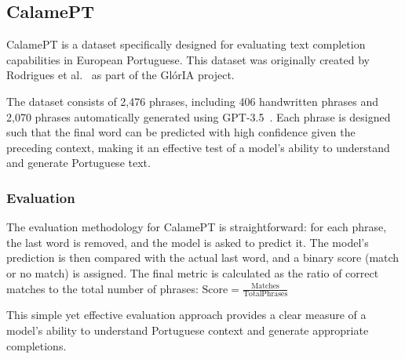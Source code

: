 \subsection{CalamePT}\label{Section3.3.2}
CalamePT is a dataset specifically designed for evaluating text completion capabilities in European Portuguese. This dataset was originally created by Rodrigues et al.~\cite{Gloria} as part of the GlórIA project.

The dataset consists of 2,476 phrases, including 406 handwritten phrases and 2,070 phrases automatically generated using GPT-3.5~\cite{Chat-GPT}. Each phrase is designed such that the final word can be predicted with high confidence given the preceding context, making it an effective test of a model's ability to understand and generate Portuguese text.

\subsubsection{Evaluation}
The evaluation methodology for CalamePT is straightforward: for each phrase, the last word is removed, and the model is asked to predict it. The model's prediction is then compared with the actual last word, and a binary score (match or no match) is assigned. The final metric is calculated as the ratio of correct matches to the total number of phrases: $\text{Score} = \frac{\text{Matches}}{\text{TotalPhrases}}$

This simple yet effective evaluation approach provides a clear measure of a model's ability to understand Portuguese context and generate appropriate completions.
